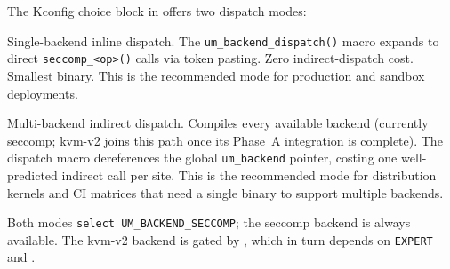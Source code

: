 The Kconfig choice block in  offers two dispatch
modes:

\begin{description}[leftmargin=2em, style=nextline]
\item[\kconfig{UM\_BACKEND\_SECCOMP\_ONLY}]
  Single-backend inline dispatch.  The \texttt{um\_backend\_dispatch()} macro
  expands to direct \texttt{seccomp\_<op>()} calls via token pasting.  Zero
  indirect-dispatch cost.  Smallest binary.  This is the recommended mode for
  production and sandbox deployments.

\item[\kconfig{UM\_BACKEND\_DYNAMIC}]
  Multi-backend indirect dispatch.  Compiles every available backend
  (currently seccomp; kvm-v2 joins this path once its Phase~A integration
  is complete).  The dispatch macro dereferences the global
  \texttt{um\_backend} pointer, costing one well-predicted indirect call per
  site.  This is the recommended mode for distribution kernels and CI matrices
  that need a single binary to support multiple backends.
\end{description}

Both modes \texttt{select UM\_BACKEND\_SECCOMP}; the seccomp backend is always
available.  The kvm-v2 backend is gated by ,
which in turn depends on \texttt{EXPERT} and .

